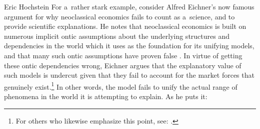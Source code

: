 \begin{artengenv}{Eric Hochstein}
For a~rather stark example, consider Alfred Eichner's now famous argument for why neoclassical economics fails to count as a~science, and to provide scientific explanations. He notes that neoclassical economics is built on numerous implicit ontic assumptions about the underlying structures and dependencies in the world which it uses as the foundation for its unifying models, and that many such ontic assumptions have proven false
\parencite[for discussion of such incorrect ontic comments, see:][p.511]{eichner_why_1983}. %
 In virtue of getting these ontic dependencies wrong, Eichner argues that the explanatory value of such models is undercut given that they fail to account for the market forces that genuinely exist.\footnote{For others who likewise emphasize this point, see: 
\parencites[][]{hall_need_2001}[][]{hausman_why_2008}[][]{gills_appallingly_2022}.%
} In other words, the model fails to unify the actual range of phenomena in the world it is attempting to explain. As he puts it:



\end{artengenv}
